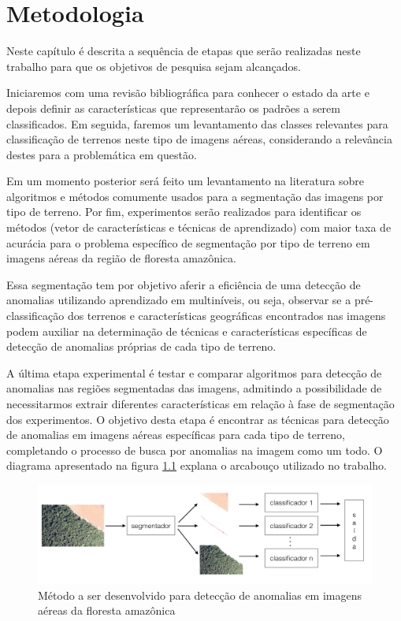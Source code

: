\chapter{Metodologia}\label{cap:metodologia}

Neste capítulo é descrita a sequência de etapas que serão realizadas neste trabalho para que os objetivos de pesquisa sejam alcançados. 

Iniciaremos com uma revisão bibliográfica para conhecer o estado da arte e depois definir as características que representarão os padrões a serem classificados. Em seguida, faremos um levantamento das classes relevantes para classificação de terrenos neste tipo de imagens aéreas, considerando a relevância destes para a problemática em questão.

Em um momento posterior será feito um levantamento na literatura sobre algoritmos e métodos comumente usados para a segmentação das imagens por tipo de terreno. Por fim, experimentos serão realizados para identificar os métodos (vetor de características e técnicas de aprendizado) com maior taxa de acurácia para o problema específico de segmentação por tipo de terreno em imagens aéreas da região de floresta amazônica.

Essa segmentação tem por objetivo aferir a eficiência de uma detecção de anomalias utilizando aprendizado em multiníveis, ou seja, observar se a pré-classificação dos terrenos e características geográficas encontrados nas imagens podem auxiliar na determinação de técnicas e características específicas de detecção de anomalias próprias de cada tipo de terreno.

A última etapa experimental é testar e comparar algoritmos para detecção de anomalias nas regiões segmentadas das imagens, admitindo a possibilidade de necessitarmos extrair diferentes características em relação à fase de segmentação dos experimentos. O objetivo desta etapa é encontrar as técnicas para detecção de anomalias em imagens aéreas específicas para cada tipo de terreno, completando o processo de busca por anomalias na imagem como um todo. O diagrama apresentado na figura \ref{fig:metDiagrama} explana o arcabouço utilizado no trabalho.

\begin{figure}[h]
    \includegraphics[width=\textwidth]{imgs/diagrama}
    \caption{Método a ser desenvolvido para detecção de anomalias em imagens aéreas da floresta amazônica}
    \label{fig:metDiagrama}
\end{figure}

